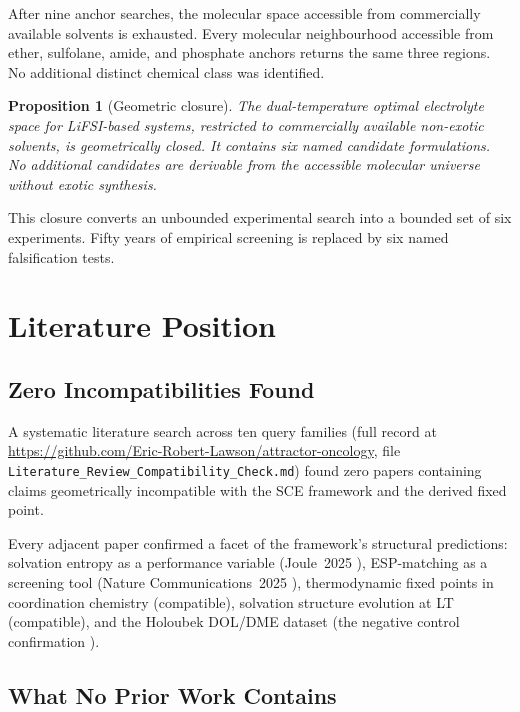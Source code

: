 \documentclass[11pt]{article}
\theoremstyle{plain}
\newtheorem{proposition}[theorem]{Proposition}
\theoremstyle{definition}
\theoremstyle{remark}
\begin{document}
After nine anchor searches, the molecular space accessible from commercially
available solvents is exhausted.  Every molecular neighbourhood accessible from
ether, sulfolane, amide, and phosphate anchors returns the same three regions.
No additional distinct chemical class was identified.

\begin{proposition}[Geometric closure]
The dual-temperature optimal electrolyte space for LiFSI-based systems,
restricted to commercially available non-exotic solvents, is geometrically
closed.  It contains six named candidate formulations.  No additional candidates
are derivable from the accessible molecular universe without exotic synthesis.
\end{proposition}

This closure converts an unbounded experimental search into a bounded set of
six experiments.  Fifty years of empirical screening is replaced by six named
falsification tests.

\section{Literature Position}

\subsection{Zero Incompatibilities Found}

A systematic literature search across ten query families
(full record at \url{https://github.com/Eric-Robert-Lawson/attractor-oncology},
file \texttt{Literature\_Review\_Compatibility\_Check.md})
found zero papers containing claims geometrically incompatible with the SCE
framework and the derived fixed point.

Every adjacent paper confirmed a facet of the framework's structural predictions:
solvation entropy as a performance variable (Joule~2025 \cite{Luo2025}),
ESP-matching as a screening tool (Nature Communications~2025 \cite{Park2025}),
thermodynamic fixed points in coordination chemistry (compatible),
solvation structure evolution at LT (compatible), and the
Holoubek DOL/DME dataset (the negative control confirmation \cite{Holoubek2021}).

\subsection{What No Prior Work Contains}
\end{document}
